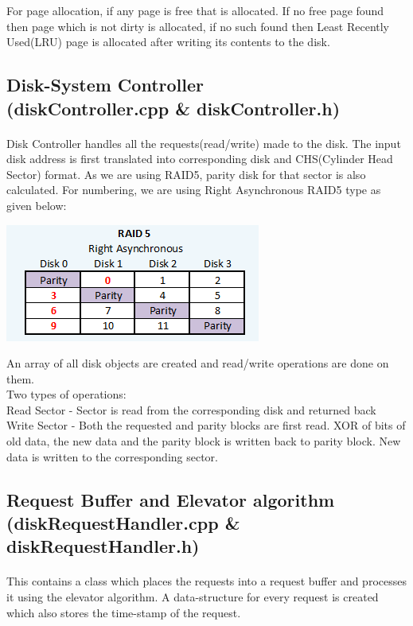 \documentclass[11pt]{article}
\begin{document}
For page allocation, if any page is free that is allocated. If no free page found then page which is not dirty is allocated, if no such found then Least Recently Used(LRU) page is allocated after writing its contents to the disk.

\subsection{Disk-System Controller \\ (diskController.cpp \& diskController.h)}
\paragraph{}
Disk Controller handles all the requests(read/write) made to the disk. The input disk address is first translated into corresponding disk and CHS(Cylinder Head Sector) format. As we are using RAID5, parity disk for that sector is also calculated. For numbering, we are using Right Asynchronous RAID5 type as given below:
\begin{center}
\includegraphics[scale=0.5]{raid5.png}
\end{center}

An array of all disk objects are created and read/write operations are done on them. \\
Two types of operations: \\
Read Sector -  Sector is read from the corresponding disk and returned back \\
Write Sector - Both the requested and parity blocks are first read. XOR of bits of old data, the new data and the parity block is written back to parity block. New data is written to the corresponding sector.

\subsection{Request Buffer and Elevator algorithm \\ (diskRequestHandler.cpp \& diskRequestHandler.h)}
\paragraph{}
This contains a class which places the requests into a request buffer and processes it using the elevator algorithm. A data-structure for every request is created which also stores the time-stamp of the request.
\end{document}
